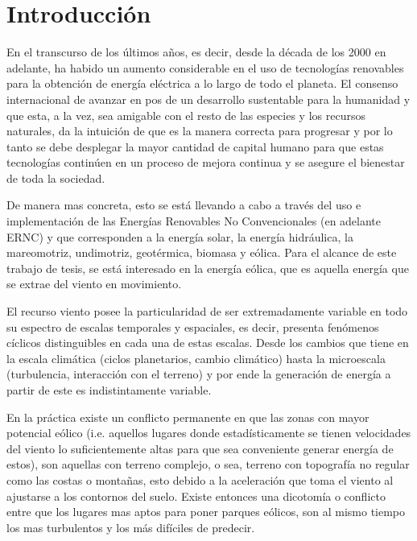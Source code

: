 \chapter{Introducción}
En el transcurso de los últimos años, es decir, desde la década de los 2000 en adelante, ha habido un aumento considerable en el uso de tecnologías renovables para la obtención de energía eléctrica a lo largo de todo el planeta. El consenso internacional de avanzar en pos de un desarrollo sustentable para la humanidad y que esta, a la vez, sea amigable con el resto de las especies y los recursos naturales, da la intuición de que es la manera correcta para progresar y por lo tanto se debe desplegar la mayor cantidad de capital humano para que estas tecnologías continúen en un proceso de mejora continua y se asegure el bienestar de toda la sociedad.

De manera mas concreta, esto se está llevando a cabo a través del uso e implementación de las Energías Renovables No Convencionales (en adelante ERNC) y que corresponden a la energía solar, la energía hidráulica, la mareomotriz, undimotriz, geotérmica, biomasa y eólica. Para el alcance de este trabajo de tesis, se está interesado en la energía eólica, que es aquella energía que se extrae del viento en movimiento.

El recurso viento posee la particularidad de ser extremadamente variable en todo su espectro de escalas temporales y espaciales, es decir, presenta fenómenos cíclicos distinguibles en cada una de estas escalas. Desde los cambios que tiene en la escala climática (ciclos planetarios, cambio climático) hasta la microescala (turbulencia, interacción con el terreno) y por ende la generación de energía a partir de este es indistintamente variable. 
 


En la práctica existe un conflicto permanente en que las zonas con mayor potencial eólico (i.e. aquellos lugares donde estadísticamente se tienen velocidades del viento lo suficientemente altas para que sea conveniente generar energía de estos), son aquellas con terreno complejo, o sea, terreno con topografía no regular como las costas o montañas, esto debido a la aceleración que toma el viento al ajustarse a los contornos del suelo. Existe entonces una dicotomía o conflicto entre que los lugares mas aptos para poner parques eólicos, son al mismo tiempo los mas turbulentos y los más difíciles de predecir.

